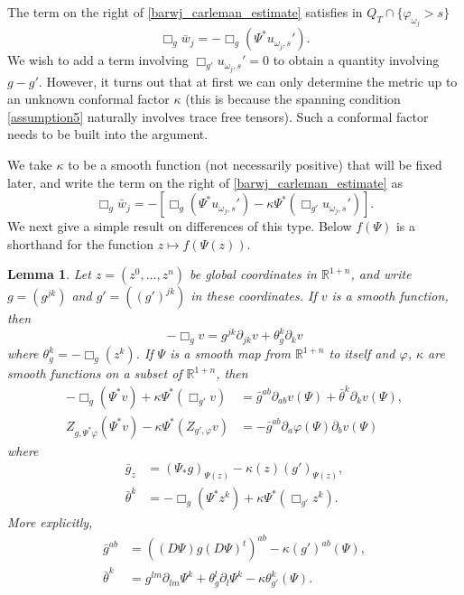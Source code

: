\documentclass[11pt,letterpaper]{amsart}
\newtheorem{Lemma}[Theorem]{Lemma}
\theoremstyle{definition}
\numberwithin{equation}{section}
\newcommand{\mR}{\mathbb{R}}                    %
\newcommand{\p}{\partial}
\def\p{\partial}
\begin{document}
The term on the right of \eqref{barwj_carleman_estimate} satisfies in $Q_T \cap \{ \varphi_{\omega_j} > s \}$ 
\[
\Box_g \bar{w}_j = -\Box_g(\Psi^* u_{\omega_j,s}').
\]
We wish to add a term involving $\Box_{g'} u_{\omega_j,s}' = 0$ to obtain a quantity involving $g - g'$. However, it turns out that at first we can only determine the metric up to an unknown conformal factor $\kappa$ (this is because the spanning condition \eqref{assumption5} naturally involves trace free tensors). Such a conformal factor needs to be built into the argument.

We take $\kappa$ to be a smooth function (not necessarily positive) that will be fixed later, and write the term on the right of \eqref{barwj_carleman_estimate} as 
\begin{equation} \label{boxg_barwj_estimate_first}
\Box_g \bar{w}_j = - \left[ \Box_g(\Psi^* u_{\omega_j,s}') - \kappa \Psi^*(\Box_{g'} u_{\omega_j,s}') \right].
\end{equation}
We next give a simple result on differences of this type. Below $f(\Psi)$ is a shorthand for the function $z \mapsto f(\Psi(z))$.

\begin{Lemma} \label{lemma_psi_differences}
Let $z = (z^0, \ldots, z^n)$ be global coordinates in $\mR^{1+n}$, and write $g = (g^{jk})$ and $g' = ((g')^{jk})$ in these coordinates. If $v$ is a smooth function, then 
\[
-\Box_g v = g^{jk} \p_{jk} v + \theta^k_g \p_k v
\]
where $\theta^k_g = -\Box_g(z^k)$. If $\Psi$ is a smooth map from $\mR^{1+n}$ to itself and $\varphi$, $\kappa$ are smooth functions on a subset of $\mR^{1+n}$, then 
\begin{align*}
-\Box_g (\Psi^* v)  + \kappa  \Psi^* (  \Box_{g'} v) &= \bar{g}^{ab} \p_{ab} v(\Psi) + \bar{\theta}^k \p_k v(\Psi), \\
Z_{g,\Psi^* \varphi}(\Psi^* v) - \kappa \Psi^*( Z_{g',\varphi} v) &= -\bar{g}^{ab} \p_a \varphi(\Psi) \p_b v(\Psi)
\end{align*}
where 
\begin{align*}
\bar{g}_{z} &= (\Psi_* g)_{\Psi(z)} - \kappa(z) (g')_{\Psi(z)}, \\
\bar{\theta}^k &= -\Box_g (\Psi^* z^k)  + \kappa \Psi^* (\Box_{g'} z^k).
\end{align*}
More explicitly, 
\begin{align*}
\bar{g}^{ab} &= ((D\Psi) g (D\Psi)^t)^{ab} - \kappa (g')^{ab}(\Psi), \\
\bar{\theta}^k &= g^{lm} \p_{lm} \Psi^k + \theta^l_g \p_l \Psi^k -  \kappa \theta_{g'}^k(\Psi).
\end{align*}
\end{Lemma}
\end{document}
